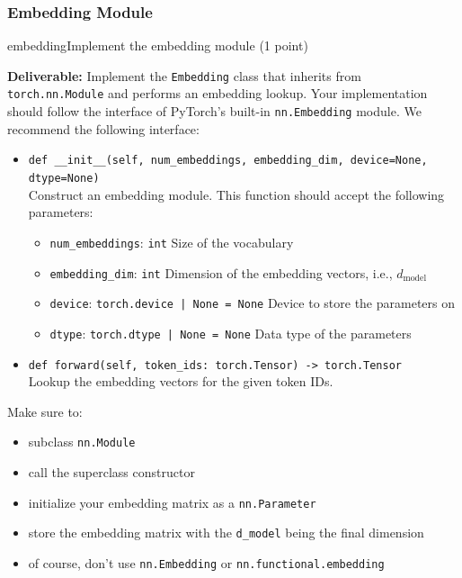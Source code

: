 \subsubsection{Embedding Module}

\begin{problembox}{embedding}{Implement the embedding module \hfill (1 point)}

    \textbf{Deliverable:} Implement the \texttt{Embedding} class that inherits from \texttt{torch.nn.Module} and performs an embedding lookup. Your implementation should follow the interface of PyTorch's built-in \texttt{nn.Embedding} module. We recommend the following interface:

    \begin{itemize}[label={}, leftmargin=0pt, itemsep=1em, parsep=0pt]

        \item \texttt{def __init__(self, num_embeddings, embedding_dim, device=None, dtype=None)} \\
              Construct an embedding module. This function should accept the following parameters:

              \begin{itemize}[label={}, leftmargin=1.5em, itemsep=0.5em, parsep=0pt, topsep=0.5em]
                  \item \texttt{num\_embeddings}: \textcolor{green!50!black}{\texttt{int}} Size of the vocabulary
                  \item \texttt{embedding\_dim}: \textcolor{green!50!black}{\texttt{int}} Dimension of the embedding vectors, i.e., $d_{\mathrm{model}}$
                  \item \texttt{device}: \textcolor{green!50!black}{\texttt{torch.device | None = None}} Device to store the parameters on
                  \item \texttt{dtype}: \textcolor{green!50!black}{\texttt{torch.dtype | None = None}} Data type of the parameters
              \end{itemize}

        \item \texttt{def forward(self, token_ids: torch.Tensor) -> torch.Tensor} \\
              Lookup the embedding vectors for the given token IDs.

    \end{itemize}

    Make sure to:
    \begin{itemize}[itemsep=0.5em, parsep=0pt, topsep=0.5em]
        \item subclass \texttt{nn.Module}
        \item call the superclass constructor
        \item initialize your embedding matrix as a \texttt{nn.Parameter}
        \item store the embedding matrix with the \texttt{d\_model} being the final dimension
        \item of course, don't use \texttt{nn.Embedding} or \texttt{nn.functional.embedding}
    \end{itemize}


\end{problembox}
